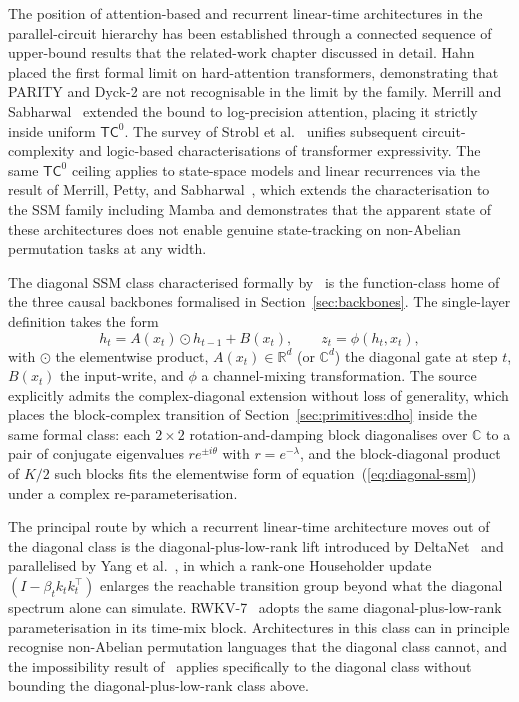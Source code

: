 The position of attention-based and recurrent linear-time
architectures in the parallel-circuit hierarchy has been established
through a connected sequence of upper-bound results that the
related-work chapter discussed in detail.
Hahn~\cite{hahn2020limitations} placed the first formal limit on
hard-attention transformers, demonstrating that PARITY and Dyck-2
are not recognisable in the limit by the family. Merrill and
Sabharwal~\cite{merrill2023parallelism} extended the bound to
log-precision attention, placing it strictly inside uniform
$\mathsf{TC}^{0}$. The survey of Strobl et
al.~\cite{strobl2024formal} unifies subsequent circuit-complexity
and logic-based characterisations of transformer expressivity. The
same $\mathsf{TC}^{0}$ ceiling applies to state-space models and
linear recurrences via the result of Merrill, Petty, and
Sabharwal~\cite{merrill2024illusion}, which extends the
characterisation to the SSM family including Mamba and demonstrates
that the apparent state of these architectures does not enable
genuine state-tracking on non-Abelian permutation tasks at any
width.

The diagonal SSM class characterised formally
by~\citet{sarrof2024expressive} is the function-class home of the
three causal backbones formalised in Section~\ref{sec:backbones}.
The single-layer definition takes the form
\begin{equation}\label{eq:diagonal-ssm}
h_{t} = A(x_{t}) \odot h_{t-1} + B(x_{t}), \qquad z_{t} = \phi(h_{t}, x_{t}),
\end{equation}
with $\odot$ the elementwise product, $A(x_{t}) \in \mathbb{R}^{d}$
(or $\mathbb{C}^{d}$) the diagonal gate at step $t$, $B(x_{t})$ the
input-write, and $\phi$ a channel-mixing transformation. The source
explicitly admits the complex-diagonal extension without loss of
generality, which places the block-complex transition of
Section~\ref{sec:primitives:dho} inside the same formal class: each
$2 \times 2$ rotation-and-damping block diagonalises over
$\mathbb{C}$ to a pair of conjugate eigenvalues $r e^{\pm i \theta}$
with $r = e^{-\lambda}$, and the block-diagonal product of $K/2$
such blocks fits the elementwise form of
equation~(\ref{eq:diagonal-ssm}) under a complex
re-parameterisation.

The principal route by which a recurrent linear-time architecture
moves out of the diagonal class is the diagonal-plus-low-rank lift
introduced by DeltaNet~\cite{schlag2021deltanet} and parallelised
by Yang et al.~\cite{yang2024deltanet}, in which a rank-one
Householder update $(I - \beta_{t} k_{t} k_{t}^{\top})$ enlarges
the reachable transition group beyond what the diagonal spectrum
alone can simulate. RWKV-7~\cite{peng2025rwkv7} adopts the same
diagonal-plus-low-rank parameterisation in its time-mix block.
Architectures in this class can in principle recognise non-Abelian
permutation languages that the diagonal class cannot, and the
impossibility result of~\citet{merrill2024illusion} applies
specifically to the diagonal class without bounding the
diagonal-plus-low-rank class above.

